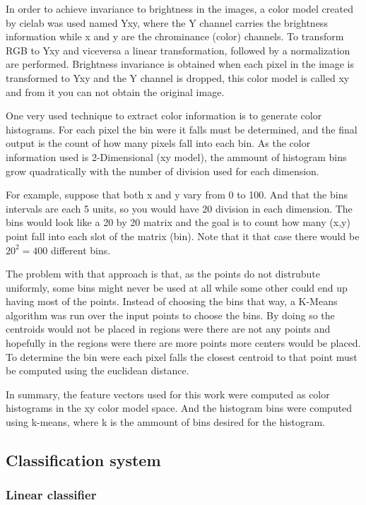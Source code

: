 \documentclass{article}
\begin{document}
In order to achieve invariance to brightness in the images, a color model created by cielab was used %
named Yxy, where the Y channel carries the brightness information while x and y are the chrominance (color) 
channels. To transform RGB to Yxy and viceversa a linear transformation, followed by a normalization are
performed. Brightness invariance is obtained when each pixel in the image is transformed to Yxy and the
Y channel is dropped, this color model is called xy and from it you can not obtain the original image.

One very used technique to extract color information is to generate color histograms. For each pixel
the bin were it falls must be determined, and the final output is the count of how many pixels fall
into each bin. As the color information used is 2-Dimensional (xy model), the ammount of histogram
bins grow quadratically with the number of division used for each dimension. 

For example, suppose that both x and y vary from 0 to 100. And that the bins intervals are each 5
units, so you would have 20 division in each dimension. The bins would look like a 20 by 20 matrix
and the goal is to count how many (x,y) point fall into each slot of the matrix (bin). Note that
it that case there would be $20^2=400$ different bins.

The problem with that approach is that, as the points do not distrubute uniformly, some bins might
never be used at all while some other could end up having most of the points. Instead of choosing the
bins that way, a K-Means algorithm was run over the input points to choose the bins. By doing so
the centroids would not be placed in regions were there are not any points and hopefully in the
regions were there are more points more centers would be placed. To determine the bin were each pixel
falls the closest centroid to that point must be computed using the euclidean distance.

In summary, the feature vectors used for this work were computed as color histograms in the
xy color model space. And the histogram bins were computed using k-means, where k is the
ammount of bins desired for the histogram.


\subsection{Classification system}

\subsubsection{Linear classifier}
\end{document}
